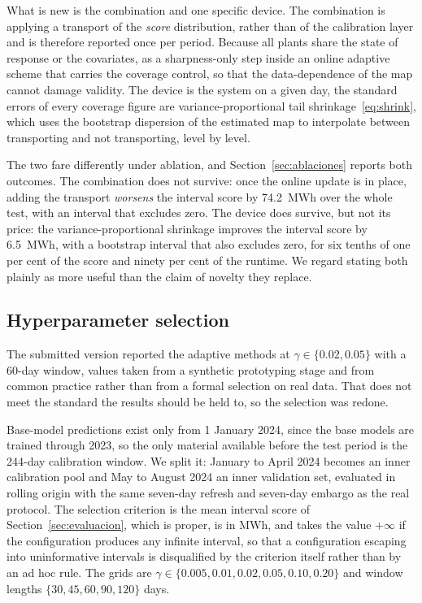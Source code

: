 \documentclass[preprint,3p,times]{elsarticle}
\providecommand{\DIFaddtex}[1]{{\protect\color{blue} \sf #1}} %
\providecommand{\DIFdeltex}[1]{{\protect\color{red} \scriptsize #1}} %
\providecommand{\DIFaddbegin}{} %
\providecommand{\DIFaddend}{} %
\providecommand{\DIFdelbegin}{} %
\providecommand{\DIFdelend}{} %
\providecommand{\DIFadd}[1]{\texorpdfstring{\DIFaddtex{#1}}{#1}} %
\providecommand{\DIFdel}[1]{\texorpdfstring{\DIFdeltex{#1}}{}} %
\begin{document}
\DIFadd{What is new is the combination and one specific device. The combination is applying a transport of the \emph{score} distribution, }\DIFaddend rather than of the \DIFdelbegin \DIFdel{calibration layer and is therefore reported once per period. Because all plants share the state of }\DIFdelend \DIFaddbegin \DIFadd{response or the covariates, as a sharpness-only step inside an online adaptive scheme that carries the coverage control, so that the data-dependence of the map cannot damage validity. The device is }\DIFaddend the \DIFdelbegin \DIFdel{system on a given day, the standard errors of every coverage figure are }\DIFdelend \DIFaddbegin \DIFadd{variance-proportional tail shrinkage~\eqref{eq:shrink}, which uses the bootstrap dispersion of the estimated map to interpolate between transporting and not transporting, level by level.
}

\DIFadd{The two fare differently under ablation, and Section~\ref{sec:ablaciones} reports both outcomes. The combination does not survive: once the online update is in place, adding the transport \emph{worsens} the interval score by 74.2~MWh over the whole test, with an interval that excludes zero. The device does survive, but not its price: the variance-proportional shrinkage improves the interval score by 6.5~MWh, with a bootstrap interval that also excludes zero, for six tenths of one per cent of the score and ninety per cent of the runtime. We regard stating both plainly as more useful than the claim of novelty they replace.
}

\subsection{Hyperparameter selection}
\label{sec:seleccion}

\DIFadd{The submitted version reported the adaptive methods at $\gamma\in\{0.02,0.05\}$ with a 60-day window, values taken from a synthetic prototyping stage and from common practice rather than from a formal selection on real data. That does not meet the standard the results should be held to, so the selection was redone.
}

\DIFadd{Base-model predictions exist only from 1 January 2024, since the base models are trained through 2023, so the only material available before the test period is the 244-day calibration window. We split it: January to April 2024 becomes an inner calibration pool and May to August 2024 an inner validation set, evaluated in rolling origin with the same seven-day refresh and seven-day embargo as the real protocol. The selection criterion is the mean interval score of Section~\ref{sec:evaluacion}, which is proper, is in MWh, and takes the value $+\infty$ if the configuration produces any infinite interval, so that a configuration escaping into uninformative intervals is disqualified by the criterion itself rather than by an ad hoc rule. The grids are $\gamma\in\{0.005,0.01,0.02,0.05,0.10,0.20\}$ and window lengths $\{30,45,60,90,120\}$ days.
}
\end{document}
